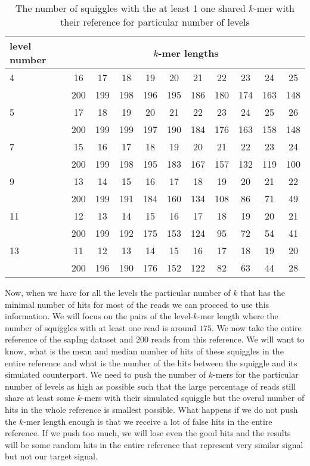 \begin{table}
\caption[TODO]{The number of squiggles with the at least 1 one shared $k$-mer with their
reference for particular number of levels}
\label{tab:sharedKmers}
\begin{center}
\begin{tabular}{|l|c|c|c|c|c|c|c|c|c|c|}
\hline
level number & \multicolumn{10}{|c|}{$k$-mer lengths} \\
\hline
4 & 16 & 17 & 18 & 19 & 20 & 21 & 22 & 23 & 24 & 25 \\\cline{2-11}
& 200 & 199 & 198 & 196 & 195 & 186 & 180 & 174 & 163 & 148 \\\cline{2-11}
\hline
5 & 17 & 18 & 19 & 20 & 21 & 22 & 23 & 24 & 25 & 26 \\\cline{2-11}
& 200 & 199 & 199 & 197 & 190 & 184 & 176 & 163 & 158 & 148 \\\cline{2-11}
\hline
7 & 15 & 16 & 17 & 18 & 19 & 20 & 21 & 22 & 23 & 24 \\\cline{2-11}
& 200 & 199 & 198 & 195 & 183 & 167 & 157 & 132 & 119 & 100 \\\cline{2-11}
\hline
9 & 13 & 14 & 15 & 16 & 17 & 18 & 19 & 20 & 21 & 22 \\\cline{2-11}
& 200 & 199 & 191 & 184 & 160 & 134 & 108 & 86 & 71 & 49 \\\cline{2-11}
\hline
11 & 12 & 13 & 14 & 15 & 16 & 17 & 18 & 19 & 20 & 21 \\\cline{2-11}
& 200 & 199 & 192 & 175 & 153 & 124 & 95 & 72 & 54 & 41 \\\cline{2-11}
\hline
13 & 11 & 12 & 13 & 14 & 15 & 16 & 17 & 18 & 19 & 20 \\\cline{2-11}
& 200 & 196 & 190 & 176 & 152 & 122 & 82 & 63 & 44 & 28 \\\cline{2-11}
\hline
\end{tabular}
\end{center}
\end{table}

Now, when we have for all the levels the particular number of $k$ that
has the minimal number of hits for most of the reads we can proceed to use
this information. We will focus on the pairs of the level-$k$-mer length
where the number of squiggles with at least one read is around $175$.
We now take the entire reference of the sapIng dataset and $200$ reads from this
reference. We will want to know, what is the mean and median number of hits of
these squiggles in the entire reference and what is the number of the hits between
the squiggle and its simulated counterpart. We need to push the number of $k$-mers
for the particular number of levels as high as possible such that the large percentage
of reads still share at least some $k$-mers with their simulated squiggle but the
overal number of hits in the whole reference is smallest possible. What happens
if we do not push the $k$-mer length enough is that we receive a lot of false hits in
the entire reference. If we push too much, we will lose even the good hits and the
results will be some random hits in the entire reference that represent very similar
signal but not our target signal.

